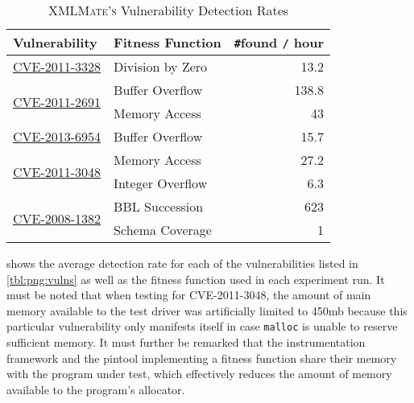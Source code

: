 \begin{table}[H]
\centering
\begin{tabular}{|l|l|r|}
\hline
Vulnerability                  & Fitness Function & \texttt\#found \texttt{/} hour \\ \hline \hline
\href{https://cve.mitre.org/cgi-bin/cvename.cgi?name=CVE-2011-3328}{CVE-2011-3328}                  & Division by Zero & 13.2           \\ \hline \hline
\multirow{2}{*}{\href{https://cve.mitre.org/cgi-bin/cvename.cgi?name=CVE-2011-2691}{CVE-2011-2691}} & Buffer Overflow  & 138.8          \\ \cline{2-3} 
                               & Memory Access    & 43             \\ \hline \hline
\href{https://cve.mitre.org/cgi-bin/cvename.cgi?name=CVE-2013-6954}{CVE-2013-6954}                  & Buffer Overflow  & 15.7           \\ \hline \hline
\multirow{2}{*}{\href{https://cve.mitre.org/cgi-bin/cvename.cgi?name=CVE-2011-3048}{CVE-2011-3048}} & Memory Access    & 27.2           \\ \cline{2-3}
							   & Integer Overflow & 6.3			   \\ \hline \hline
\multirow{2}{*}{\href{https://cve.mitre.org/cgi-bin/cvename.cgi?name=CVE-2008-1382}{CVE-2008-1382}} & BBL Succession   & 623            \\ \cline{2-3}
                               & Schema Coverage  & 1              \\ \hline
\end{tabular}
\caption{\textsc{XMLMate's} Vulnerability Detection Rates}
\label{tbl:png:rates}
\end{table}

 shows the average detection rate for each of the vulnerabilities listed in
\cref{tbl:png:vulns} as well as the fitness function used in each experiment run. It must be noted that when
testing for {\small CVE-2011-3048}, the amount of main memory available to the test driver was artificially
limited to 450mb because this particular vulnerability only manifests itself in case \texttt{malloc} is unable
to reserve sufficient memory. It must further be remarked that the \pin instrumentation framework and the
pintool implementing a fitness function share their memory with the program under test, which effectively
reduces the amount of memory available to the program's allocator.

